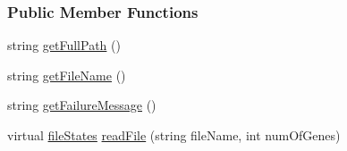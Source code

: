 \subsubsection*{Public Member Functions}
\begin{DoxyCompactItemize}
\item 
string \hyperlink{class_file_coordinator_a7d382bac08ac208a283c9c41e4be6117}{get\+Full\+Path} ()
\item 
string \hyperlink{class_file_coordinator_ab15e2283157ef9c18ebbb6e9e36f9744}{get\+File\+Name} ()
\item 
string \hyperlink{class_file_coordinator_af03a39aeaffebf1f90c25591700aa046}{get\+Failure\+Message} ()
\item 
virtual \hyperlink{class_file_coordinator_a87882b51519fff558b11f4862a021318}{file\+States} \hyperlink{class_file_coordinator_a135715b1b9b4eaab42e061ebf9fd2459}{read\+File} (string file\+Name, int num\+Of\+Genes)
\end{DoxyCompactItemize}

